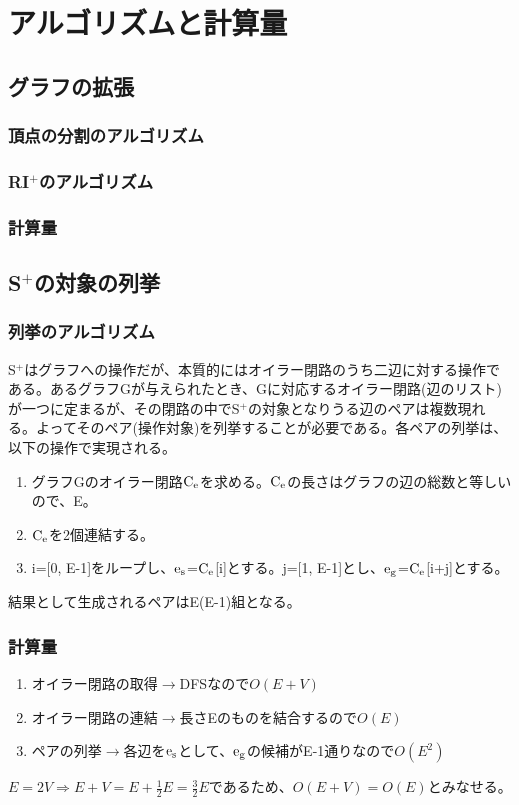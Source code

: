 \documentclass[11pt,a4j]{jarticle}
\newcommand{\splus}{S${}^\text{+}$}
\newcommand{\riplus}{RI${}^\text{+}$}
\newcommand{\fl}[1]{$\rm{#1}$}
\begin{document}
\section{アルゴリズムと計算量}

\subsection{グラフの拡張}
\subsubsection{頂点の分割のアルゴリズム}
\subsubsection{\riplus のアルゴリズム}
\subsubsection{計算量}

\subsection{\splus の対象の列挙}
\label{enum}
\subsubsection{列挙のアルゴリズム}
\splus はグラフへの操作だが、本質的にはオイラー閉路のうち二辺に対する操作である。あるグラフGが与えられたとき、Gに対応するオイラー閉路(辺のリスト)が一つに定まるが、その閉路の中で\splus の対象となりうる辺のペアは複数現れる。よってそのペア(操作対象)を列挙することが必要である。各ペアの列挙は、以下の操作で実現される。

\begin{enumerate}
    \item グラフGのオイラー閉路\fl{C_e}を求める。\fl{C_e}の長さはグラフの辺の総数と等しいので、E。
    \item \fl{C_e}を2個連結する。
    \item i=[0, E-1]をループし、\fl{e_s}=\fl{C_e}[i]とする。j=[1, E-1]とし、\fl{e_g}=\fl{C_e}[i+j]とする。
\end{enumerate}

結果として生成されるペアはE(E-1)組となる。

\subsubsection{計算量}
\begin{enumerate}
    \item オイラー閉路の取得$\rightarrow$DFSなので$O(E+V)$
    \item オイラー閉路の連結$\rightarrow$長さEのものを結合するので$O(E)$
    \item ペアの列挙$\rightarrow$各辺を\fl{e_s}として、\fl{e_g}の候補がE-1通りなので$O(E^2)$
\end{enumerate}
$E=2V \Rightarrow E+V=E+\frac{1}{2}E=\frac{3}{2}E$であるため、$O(E+V)=O(E)$とみなせる。
\end{document}
